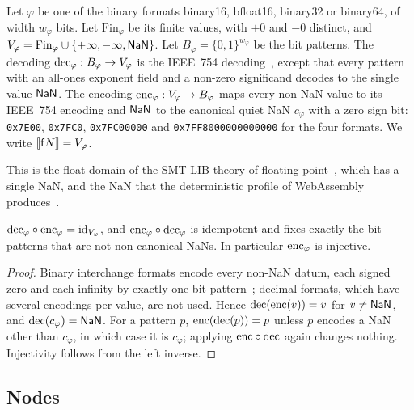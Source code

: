 \begin{definition}\label{def:onenan}
Let $\varphi$ be one of the binary formats binary16, bfloat16, binary32 or binary64, of width
$w_\varphi$ bits. Let $\mathrm{Fin}_\varphi$ be its finite values, with $+0$ and $-0$ distinct,
and $V_\varphi = \mathrm{Fin}_\varphi \cup \{+\infty,-\infty,\mathsf{NaN}\}$. Let
$B_\varphi = \{0,1\}^{w_\varphi}$ be the bit patterns. The decoding
$\mathrm{dec}_\varphi : B_\varphi\to V_\varphi$ is the IEEE~754 decoding~\cite{ieee754-2019}, except
that every pattern with an all-ones exponent field and a non-zero significand decodes to the
single value $\mathsf{NaN}$. The encoding $\mathrm{enc}_\varphi : V_\varphi\to B_\varphi$ maps every non-NaN
value to its IEEE~754 encoding and $\mathsf{NaN}$ to the canonical quiet NaN $c_\varphi$ with a zero
sign bit: \texttt{0x7E00}, \texttt{0x7FC0}, \texttt{0x7FC00000} and
\texttt{0x7FF8000000000000} for the four formats. We write $\llbracket \mathsf{f}N \rrbracket=V_\varphi$.
\end{definition}

This is the float domain of the SMT-LIB theory of floating point~\cite{brain2015fp}, which has
a single NaN, and the NaN that the deterministic profile of WebAssembly
produces~\cite{wasm-spec}.

\begin{lemma}\label{lem:encdec}
$\mathrm{dec}_\varphi\circ\mathrm{enc}_\varphi=\mathrm{id}_{V_\varphi}$, and $\mathrm{enc}_\varphi\circ\mathrm{dec}_\varphi$ is
idempotent and fixes exactly the bit patterns that are not non-canonical NaNs. In particular
$\mathrm{enc}_\varphi$ is injective.
\end{lemma}
\begin{proof}
Binary interchange formats encode every non-NaN datum, each signed zero and each infinity by
exactly one bit pattern~\cite{ieee754-2019}; decimal formats, which have several encodings per
value, are not used. Hence $\mathrm{dec}(\mathrm{enc}(v))=v$ for $v\neq\mathsf{NaN}$, and $\mathrm{dec}(c_\varphi)=\mathsf{NaN}$. For a
pattern $p$, $\mathrm{enc}(\mathrm{dec}(p))=p$ unless $p$ encodes a NaN other than $c_\varphi$, in which case it
is $c_\varphi$; applying $\mathrm{enc}\circ\mathrm{dec}$ again changes nothing. Injectivity follows from the
left inverse.
\end{proof}

\subsection{Nodes}

